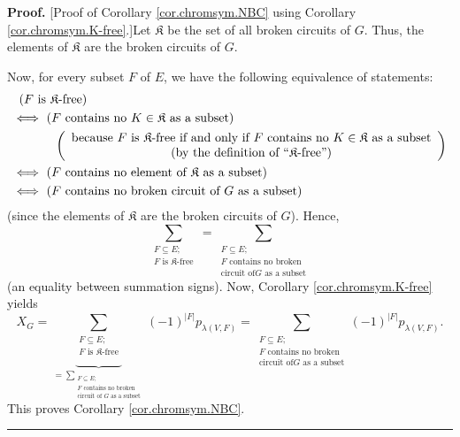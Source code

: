 \documentclass[numbers=enddot,12pt,final,onecolumn,notitlepage]{scrartcl}%
\theoremstyle{definition}
\newenvironment{proof}[1][Proof]{\noindent\textbf{#1.} }{\ \rule{0.5em}{0.5em}}
\newenvironment{verlong}{}{}
\let\sumnonlimits\sum
\renewcommand{\sum}{\sumnonlimits\limits}
\begin{document}
\begin{verlong}
\begin{proof}
[Proof of Corollary \ref{cor.chromsym.NBC} using Corollary
\ref{cor.chromsym.K-free}.]Let $\mathfrak{K}$ be the set of all broken
circuits of $G$. Thus, the elements of $\mathfrak{K}$ are the broken circuits
of $G$.

Now, for every subset $F$ of $E$, we have the following equivalence of
statements:%
\begin{align*}
&  \ \left(  F\text{ is }\mathfrak{K}\text{-free}\right) \\
&  \Longleftrightarrow\ \left(  F\text{ contains no }K\in\mathfrak{K}\text{ as
a subset}\right) \\
&  \ \ \ \ \ \ \ \ \ \ \left(
\begin{array}
[c]{c}%
\text{because }F\text{ is }\mathfrak{K}\text{-free if and only if }F\text{
contains no }K\in\mathfrak{K}\text{ as a subset}\\
\text{(by the definition of \textquotedblleft}\mathfrak{K}%
\text{-free\textquotedblright)}%
\end{array}
\right) \\
&  \Longleftrightarrow\ \left(  F\text{ contains no element of }%
\mathfrak{K}\text{ as a subset}\right) \\
&  \Longleftrightarrow\ \left(  F\text{ contains no broken circuit of }G\text{
as a subset}\right)
\end{align*}
(since the elements of $\mathfrak{K}$ are the broken circuits of $G$). Hence,
\[
\sum_{\substack{F\subseteq E;\\F\text{ is }\mathfrak{K}\text{-free}}%
}=\sum_{\substack{F\subseteq E;\\F\text{ contains no broken}\\\text{circuit of
}G\text{ as a subset}}}
\]
(an equality between summation signs). Now, Corollary
\ref{cor.chromsym.K-free} yields%
\[
X_{G}=\underbrace{\sum_{\substack{F\subseteq E;\\F\text{ is }\mathfrak{K}%
\text{-free}}}}_{=\sum_{\substack{F\subseteq E;\\F\text{ contains no
broken}\\\text{circuit of }G\text{ as a subset}}}}\left(  -1\right)
^{\left\vert F\right\vert }p_{\lambda\left(  V,F\right)  }=\sum
_{\substack{F\subseteq E;\\F\text{ contains no broken}\\\text{circuit of
}G\text{ as a subset}}}\left(  -1\right)  ^{\left\vert F\right\vert
}p_{\lambda\left(  V,F\right)  }.
\]
This proves Corollary \ref{cor.chromsym.NBC}.
\end{proof}
\end{verlong}
\end{document}
